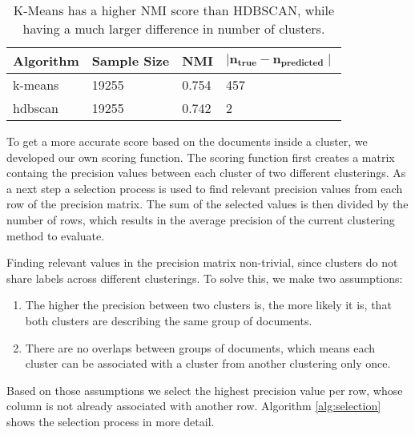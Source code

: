 
\begin{table}[h]
    \centering
    \begin{tabular}{|l|l|l|l|}
    \hline
    \textbf{Algorithm} & \textbf{Sample Size} & \textbf{NMI}  & $\mathbf{ \mid n_{true} - n_{predicted} \mid }$ \\ \hline
    k-means & 19255 & 0.754 & 457 \\ \hline
    hdbscan & 19255 & 0.742 & 2 \\ \hline
    \end{tabular}
    \caption{K-Means has a higher NMI score than HDBSCAN, while having a much larger difference in number of clusters.}
    \label{tab:nmi_kmeans_example}
\end{table}

To get a more accurate score based on the documents inside a cluster, we developed our own scoring function. The scoring function first creates a matrix containg the precision values between each cluster of two different clusterings. As a next step a selection process is used to find relevant precision values from each row of the precision matrix. The sum of the selected values is then divided by the number of rows, which results in the average precision of the current clustering method to evaluate.  

Finding relevant values in the precision matrix non-trivial, since clusters do not share labels across different clusterings. To solve this, we make two assumptions:
\begin{enumerate} 
\item The higher the precision between two clusters is, the more likely it is, that both clusters are describing the same group of documents. 
\item There are no overlaps between groups of documents, which means each cluster can be associated with a cluster from another clustering only once. 
\end{enumerate}

Based on those assumptions we select the highest precision value per row, whose column is not already associated with another row. Algorithm \ref{alg:selection} shows the selection process in more detail. 

